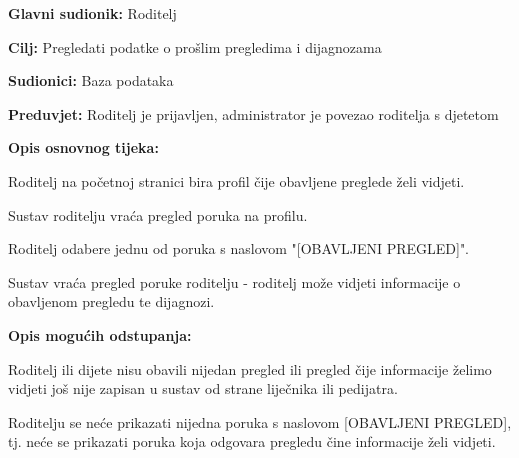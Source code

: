 					\noindent {}
					\begin{packed_item}
						
						\item \textbf{Glavni sudionik: }Roditelj
						\item  \textbf{Cilj:} Pregledati podatke o prošlim pregledima i dijagnozama
						\item  \textbf{Sudionici:} Baza podataka
						\item  \textbf{Preduvjet:} Roditelj je prijavljen, administrator je povezao roditelja s djetetom
						\item  \textbf{Opis osnovnog tijeka:}
						
						\item[] \begin{packed_enum}
							
							\item Roditelj na početnoj stranici bira profil čije obavljene preglede želi vidjeti.
							\item Sustav roditelju vraća pregled poruka na profilu.
							\item Roditelj odabere jednu od poruka s naslovom "[OBAVLJENI PREGLED]".
							\item Sustav vraća pregled poruke roditelju - roditelj može vidjeti informacije o obavljenom pregledu te dijagnozi.
						\end{packed_enum}
						
						\item  \textbf{Opis mogućih odstupanja:}
						
						\item[] \begin{packed_item}
							
							\item[3.a] Roditelj ili dijete nisu obavili nijedan pregled ili pregled čije informacije želimo vidjeti još nije zapisan u sustav od strane liječnika ili pedijatra.
							\item[] \begin{packed_enum}
								
								\item Roditelju se neće prikazati nijedna poruka s naslovom [OBAVLJENI PREGLED], tj. neće se prikazati poruka koja odgovara pregledu čine informacije želi vidjeti.
							\end{packed_enum}
							
							
						\end{packed_item}
						
						
					\end{packed_item}
					
